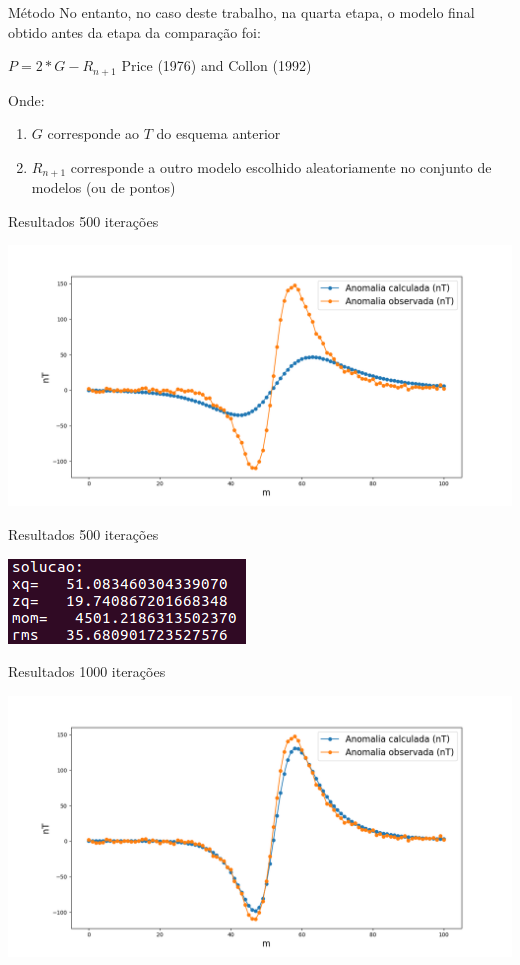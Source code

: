 \documentclass{beamer}
\begin{document}
\begin{frame}{Método}
No entanto, no caso deste trabalho, na quarta etapa, o modelo final obtido antes da etapa da comparação foi:
\begin{center}
$P = 2*G - R_{n+1}$
Price (1976) and Collon (1992)
\end{center}
Onde:
\begin{enumerate}
\item $G$ corresponde ao $T$ do esquema anterior
\item $R_{n+1}$ corresponde a outro modelo escolhido aleatoriamente no conjunto de modelos (ou de pontos)
\end{enumerate}
\end{frame}

\begin{frame}{Resultados}
500 iterações
\begin{center}
\includegraphics[scale=0.35]{500iteracoes}
\end{center}
\end{frame}

\begin{frame}{Resultados}
500 iterações
\begin{center}
\includegraphics[scale=1]{rms_500}
\end{center}
\end{frame}

\begin{frame}{Resultados}
1000 iterações
\begin{center}
\includegraphics[scale=0.35]{1000iteracoes}
\end{center}
\end{frame}
\end{document}
